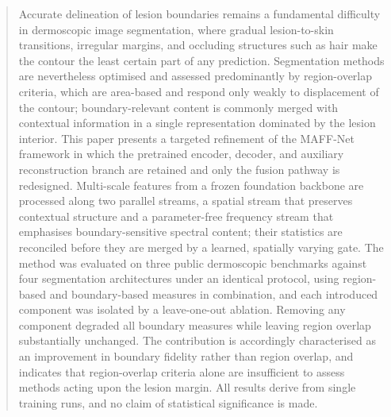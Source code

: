 \begin{abstract}
Accurate delineation of lesion boundaries remains a fundamental difficulty in dermoscopic image segmentation, where gradual lesion-to-skin transitions, irregular margins, and occluding structures such as hair make the contour the least certain part of any prediction. Segmentation methods are nevertheless optimised and assessed predominantly by region-overlap criteria, which are area-based and respond only weakly to displacement of the contour; boundary-relevant content is commonly merged with contextual information in a single representation dominated by the lesion interior. This paper presents a targeted refinement of the MAFF-Net framework in which the pretrained encoder, decoder, and auxiliary reconstruction branch are retained and only the fusion pathway is redesigned. Multi-scale features from a frozen foundation backbone are processed along two parallel streams, a spatial stream that preserves contextual structure and a parameter-free frequency stream that emphasises boundary-sensitive spectral content; their statistics are reconciled before they are merged by a learned, spatially varying gate. The method was evaluated on three public dermoscopic benchmarks against four segmentation architectures under an identical protocol, using region-based and boundary-based measures in combination, and each introduced component was isolated by a leave-one-out ablation. Removing any component degraded all boundary measures while leaving region overlap substantially unchanged. The contribution is accordingly characterised as an improvement in boundary fidelity rather than region overlap, and indicates that region-overlap criteria alone are insufficient to assess methods acting upon the lesion margin. All results derive from single training runs, and no claim of statistical significance is made.
\end{abstract}
